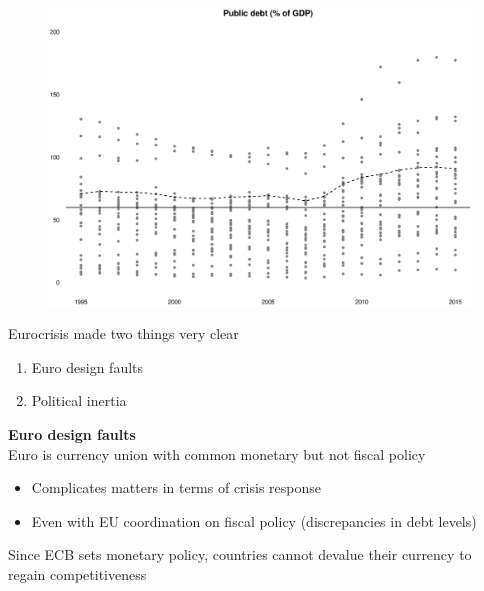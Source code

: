 \documentclass{beamer}
\begin{document}
\begin{frame}
  \begin{figure}
    \includegraphics{public_debt2.eps}
  \end{figure}
\end{frame}

\begin{frame}
  Eurocrisis made two things very clear
  \begin{enumerate}
    \item Euro design faults
    \item Political inertia
  \end{enumerate}
\end{frame}

\begin{frame}
  \textbf{Euro design faults}\\
  Euro is currency union with common monetary but not fiscal policy
  \begin{itemize}
    \item Complicates matters in terms of crisis response
    \item Even with EU coordination on fiscal policy (discrepancies in debt levels)
  \end{itemize}
  \medskip
  Since ECB sets monetary policy, countries cannot devalue their currency to regain competitiveness 
\end{frame}

\begin{frame}

\end{frame}
\end{document}
